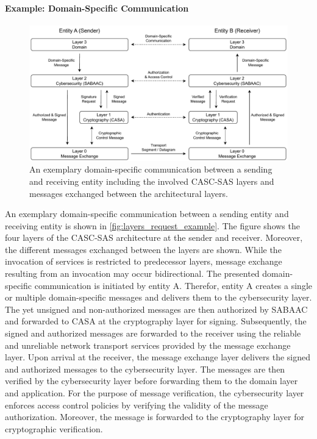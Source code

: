 \paragraph{Example: Domain-Specific Communication}
\begin{figure}
    \centering
    \includegraphics[width=1.0\linewidth]{figures/layers_request_example.drawio.pdf}
    \caption{An exemplary domain-specific communication between a sending and receiving entity including the involved CASC-SAS layers and messages exchanged between the architectural layers.}
    \label{fig:layers_request_example}
\end{figure}
An exemplary domain-specific communication between a sending entity and receiving entity is shown in \autoref{fig:layers_request_example}.
The figure shows the four layers of the CASC-SAS architecture at the sender and receiver.
Moreover, the different messages exchanged between the layers are shown.
While the invocation of services is restricted to predecessor layers, message exchange resulting from an invocation may occur bidirectional.
The presented domain-specific communication is initiated by entity A.
Therefor, entity A creates a single or multiple domain-specific messages and delivers them to the cybersecurity layer.
The yet unsigned and non-authorized messages are then authorized by SABAAC and forwarded to CASA at the cryptography layer for signing.
Subsequently, the signed and authorized messages are forwarded to the receiver using the reliable and unreliable network transport services provided by the message exchange layer.
Upon arrival at the receiver, the message exchange layer delivers the signed and authorized messages to the cybersecurity layer.
The messages are then verified by the cybersecurity layer before forwarding them to the domain layer and application.
For the purpose of message verification, the cybersecurity layer enforces access control policies by verifying the validity of the message authorization.
Moreover, the message is forwarded to the cryptography layer for cryptographic verification.

